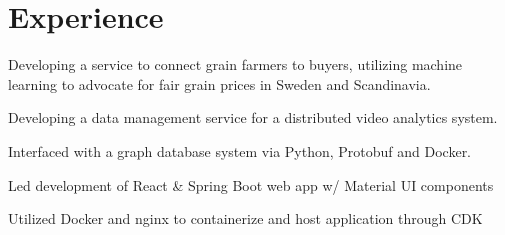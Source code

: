 \documentclass[letterpaper]{resume} %
\begin{document}
\hfill
%
%
\begin{minipage}[t]{0.66\textwidth} %

\section{Experience}

Developing a service to connect grain farmers to buyers,
utilizing machine learning to advocate for fair grain prices in Sweden and Scandinavia.
\sectionspace


\vspace{\topsep} %
\begin{tightitemize}
  \item Developing a data management service for a distributed video analytics system.
  \item Interfaced with a graph database system via Python, Protobuf and Docker.
\end{tightitemize}
\sectionspace


\begin{tightitemize}
  \item Led development of React \& Spring Boot web app w/ Material UI components
  \item Utilized Docker and nginx to containerize and host application through CDK
\end{tightitemize}
\sectionspace



\end{minipage}
\end{document}

